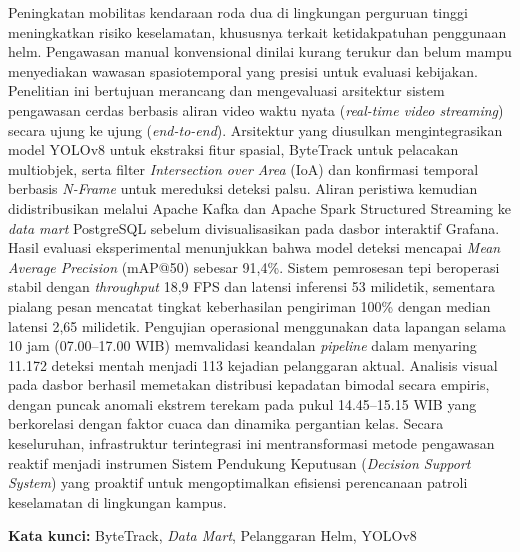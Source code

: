 \begin{abstractind}
  \justifying
  Peningkatan mobilitas kendaraan roda dua di lingkungan perguruan tinggi meningkatkan risiko keselamatan, khususnya terkait ketidakpatuhan penggunaan helm. Pengawasan manual konvensional dinilai kurang terukur dan belum mampu menyediakan wawasan spasiotemporal yang presisi untuk evaluasi kebijakan. Penelitian ini bertujuan merancang dan mengevaluasi arsitektur sistem pengawasan cerdas berbasis aliran video waktu nyata (\textit{real-time video streaming}) secara ujung ke ujung (\textit{end-to-end}). Arsitektur yang diusulkan mengintegrasikan model YOLOv8 untuk ekstraksi fitur spasial, ByteTrack untuk pelacakan multiobjek, serta filter \textit{Intersection over Area} (IoA) dan konfirmasi temporal berbasis \textit{N-Frame} untuk mereduksi deteksi palsu. Aliran peristiwa kemudian didistribusikan melalui Apache Kafka dan Apache Spark Structured Streaming ke \textit{data mart} PostgreSQL sebelum divisualisasikan pada dasbor interaktif Grafana. Hasil evaluasi eksperimental menunjukkan bahwa model deteksi mencapai \textit{Mean Average Precision} (mAP@50) sebesar 91,4\%. Sistem pemrosesan tepi beroperasi stabil dengan \textit{throughput} 18,9 FPS dan latensi inferensi 53 milidetik, sementara pialang pesan mencatat tingkat keberhasilan pengiriman 100\% dengan median latensi 2,65 milidetik. Pengujian operasional menggunakan data lapangan selama 10 jam (07.00--17.00 WIB) memvalidasi keandalan \textit{pipeline} dalam menyaring 11.172 deteksi mentah menjadi 113 kejadian pelanggaran aktual. Analisis visual pada dasbor berhasil memetakan distribusi kepadatan bimodal secara empiris, dengan puncak anomali ekstrem terekam pada pukul 14.45--15.15 WIB yang berkorelasi dengan faktor cuaca dan dinamika pergantian kelas. Secara keseluruhan, infrastruktur terintegrasi ini mentransformasi metode pengawasan reaktif menjadi instrumen Sistem Pendukung Keputusan (\textit{Decision Support System}) yang proaktif untuk mengoptimalkan efisiensi perencanaan patroli keselamatan di lingkungan kampus.

\noindent
\textbf{Kata kunci:} ByteTrack, \textit{Data Mart}, Pelanggaran Helm, YOLOv8 %
\end{abstractind}
